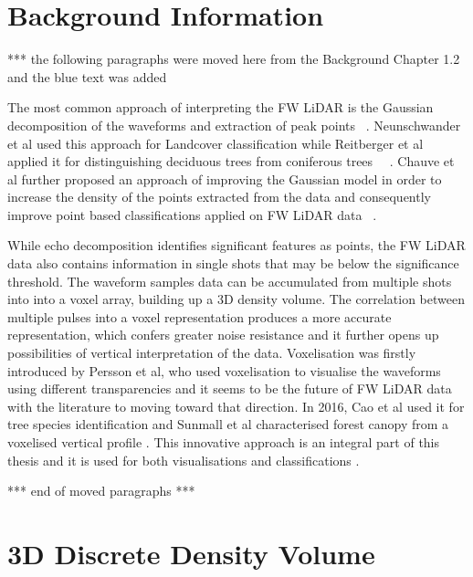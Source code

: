 \documentclass{subfiles}
\begin{document}
\section{Background Information}
		\par {\color{red} *** the following paragraphs were moved here from the Background Chapter 1.2 and the blue text was added}
		
		\par The most common approach of interpreting the FW LiDAR is the Gaussian decomposition of the waveforms and extraction of peak points ~\cite{Wanger2006}. Neunschwander et al used this approach for Landcover classification while Reitberger et al applied it for distinguishing deciduous trees from coniferous trees ~\cite{Neuenschwander2009}~\cite{Reitberger2008}. Chauve et al further proposed an approach of improving the Gaussian model in order to increase the density of the points extracted from the data and consequently improve point based classifications applied on FW LiDAR data ~\cite{Chauve2007}. 
		
		\par While echo decomposition identifies significant features as points, the FW LiDAR data also contains information in single shots that may be below the significance threshold. The waveform samples data can be accumulated from multiple shots into {\color{blue} into a voxel array, building up a 3D density volume. The correlation between multiple pulses into a voxel representation produces a more accurate representation, which confers greater noise resistance and it further opens up possibilities of vertical interpretation of the data.} Voxelisation was firstly introduced by Persson et al, who used voxelisation to visualise the waveforms using different transparencies \cite{Persson2005} and it seems to be the future of FW LiDAR data with the literature to moving toward that direction. In 2016, Cao et al used it for tree species identification \cite{Cao2016} and Sunmall et al characterised forest canopy from a voxelised vertical profile \cite{Sumnall2016}. This innovative approach is an integral part of this thesis and it is used for both visualisations and classifications \cite{Miltiadou2014}\cite{Miltiadou2015}. 
		\par {\color{red} *** end of moved paragraphs *** }
		

	
\section{3D Discrete Density Volume}
\end{document}
